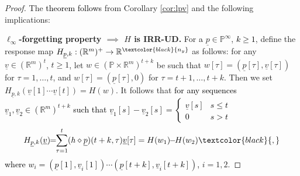 \documentclass[journal,twoside,web]{ieeecolor}
\begin{document}
  \begin{proof}
    The \textcolor{black}{theorem follows} from Corollary \ref{cor:lpv} and the following implications:

    \textbf{$\ell_{\infty}$-forgetting property $\implies$ $H$ is IRR-UD.}
      For \textcolor{black}{a} $\underline{p} \in \mathbb{P}^{\infty}$, \textcolor{black}{$k \ge 1$},
      define the response map
        \( H_{\underline{p},k}:(\mathbb{R}^m)^{+} \to \mathbb{R}^{\textcolor{black}{n_y}}\)
        as follows: for any $\underline{v} \in (\mathbb{R}^m)^{t}$,
        $t \ge 1$,
          let $w \in (\mathbb{P} \times \mathbb{R}^m)^{t+k}$ be such that
          $w[\tau]=(\underline{p}[\tau],\underline{v}[\tau])$ for $\tau=1,\ldots, t$, and $w[\tau]=(\underline{p}[\tau],0)$ for $\tau=t+1,\ldots, t+k$. Then we set
          $H_{\underline{p},k}(\underline{v}[1] \cdots \underline{v}[t]) = H(w)$. 
          It follows that 
          \textcolor{black}{for any sequences $\underline{v}_1,\underline{v}_2 \in (\mathbb{R}^m)^{t+k}$ such that 
          $\underline{v}_1[s]-\underline{v}_2[s]=\left\{\begin{array}{rl} \underline{v}[s] & s \le t \\ 0 & s > t \end{array}\right.$}
          \begin{equation}
            \label{eq:F_p_k}
             H_{\underline{p},k}(\underline{v})
            \!\!=\!\! \sum_{\tau=1}^{t} (h \diamond \underline{p})(t+k,\tau)\underline{v}[\tau]=H(w_1) \!\!-\!\! H(w_2) \textcolor{black}{,}
            \end{equation}
          \textcolor{black}{where $w_i=(\underline{p}[1],\underline{v}_i[1]) \cdots (\underline{p}[t+k],\underline{v}_i[t+k])$,}
          $i=1,2$.


\end{proof}
\end{document}
